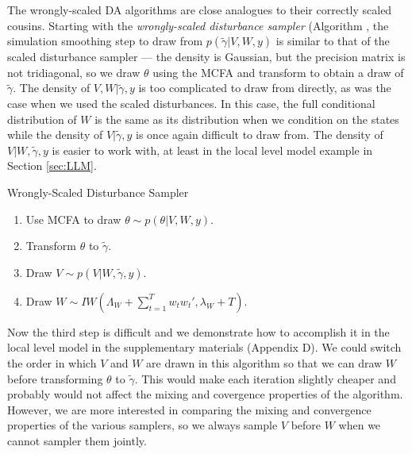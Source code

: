\documentclass[12pt]{article}
\begin{document}
The wrongly-scaled DA algorithms are close analogues to their correctly scaled cousins. Starting with the {\it wrongly-scaled disturbance sampler} (Algorithm , the simulation smoothing step to draw from $p(\tilde{\gamma}|V,W,y)$ is similar to that of the scaled disturbance sampler --- the density is Gaussian, but the precision matrix is not tridiagonal, so we draw $\theta$ using the MCFA and transform to obtain a draw of $\tilde{\gamma}$. The density of $V,W|\tilde{\gamma},y$ is too complicated to draw from directly, as was the case when we used the scaled disturbances. In this case, the full conditional distribution of $W$ is the same as its distribution when we condition on the states while the density of $V|\tilde{\gamma},y$ is once again difficult to draw from. The density of $V|W,\tilde{\gamma},y$ is easier to work with, at least in the local level model example in Section \ref{sec:LLM}. 
\begin{alg*}[WSD]Wrongly-Scaled Disturbance Sampler\label{alg:DLMwdist}
\begin{enumerate}
\item Use MCFA to draw $\theta \sim p(\theta|V,W,y)$.
\item Transform $\theta$ to $\tilde{\gamma}$.
\item Draw $V \sim p(V|W,\tilde{\gamma},y)$.
\item Draw $W \sim IW\left(\Lambda_W + \sum_{t=1}^Tw_tw_t',\lambda_{W} + T\right)$.
\end{enumerate}
\end{alg*}\noindent
Now the third step is difficult and we demonstrate how to accomplish it in the local level model in the supplementary materials (Appendix D). We could switch the order in which $V$ and $W$ are drawn in this algorithm so that we can draw $W$ before transforming $\theta$ to $\tilde{\gamma}$. This would make each iteration slightly cheaper and probably would not affect the mixing and covergence properties of the algorithm. However, we are more interested in comparing the mixing and convergence properties of the various samplers, so we always sample $V$ before $W$ when we cannot sampler them jointly.
\end{document}
